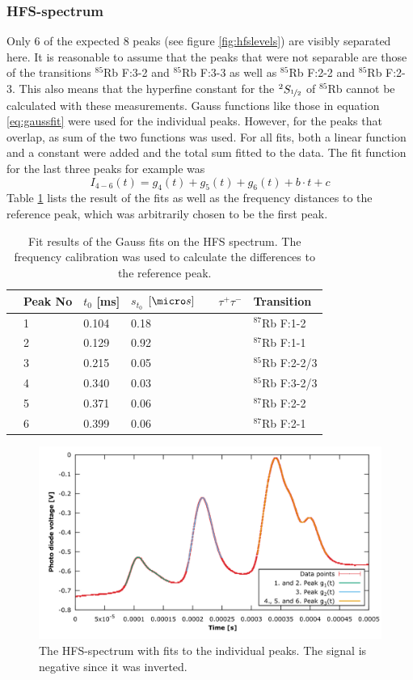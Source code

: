 \subsubsection*{HFS-spectrum}
Only 6 of the expected 8 peaks (see figure \ref{fig:hfslevels}) are visibly separated here. It is reasonable to assume that the peaks that were not separable are those of the transitions $^{85}$Rb F:3-2 and $^{85}$Rb F:3-3 as well as $^{85}$Rb F:2-2 and $^{85}$Rb F:2-3. This also means that the hyperfine constant for the $^2S_{\nicefrac{1}{2}}$ of $^{85}$Rb cannot be calculated with these measurements.
Gauss functions like those in equation \ref{eq:gaussfit} were used for the individual peaks. However, for the peaks that overlap, as sum of the two functions was used. For all fits, both a linear function and a constant were added and the total sum fitted to the data. The fit function for the last three peaks for example was
\begin{equation}
I_{4-6}(t)=g_4(t)+g_5(t)+g_6(t)+b\cdot t+c
\end{equation}
Table \ref{tb:HFSresults} lists the result of the fits as well as the frequency distances to the reference peak, which was arbitrarily chosen to be the first peak.
\begin{table}\centering
	\begin{tabular}{@{}lllllll@{}}
		\toprule
		&Peak No &$t_0$ [ms]&$s_{t_0}$ $\unit{}{[\micro s]}$ & &$\tau^+\tau^-$&Transition\\
		\midrule
		&1&0.104&0.18&&&$^{87}$Rb F:1-2\\
		&2&0.129&0.92&&&$^{87}$Rb F:1-1\\
		&3&0.215&0.05&&&$^{85}$Rb F:2-2/3\\
		&4&0.340&0.03&&&$^{85}$Rb F:3-2/3\\
		&5&0.371&0.06&&&$^{87}$Rb F:2-2\\
		&6&0.399&0.06&&&$^{87}$Rb F:2-1\\	
		\bottomrule
	\end{tabular}
	\caption[HFS peaks fit results]{Fit results of the Gauss fits on the HFS spectrum. The frequency calibration was used to calculate the differences to the reference peak.}
	\label{tb:HFSresults}
\end{table}


\begin{figure}[htb]
	\centering
	\includegraphics[width=1.0\linewidth]{graphics/HFS_fits}
	\caption[The HFS-spectrum]{The HFS-spectrum with fits to the individual peaks. The signal is negative since it was inverted.}
	\label{fig:HFS_fits}
\end{figure}


